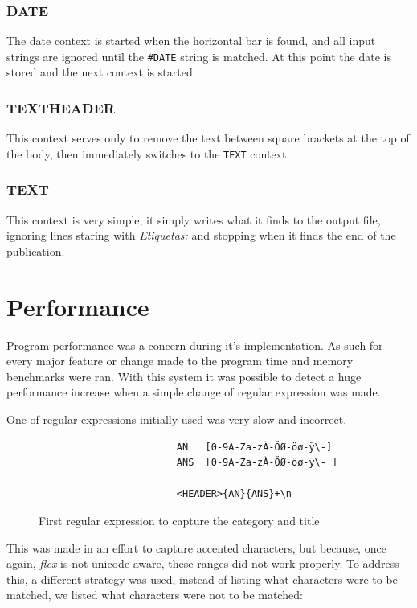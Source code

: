 \documentclass[a4paper]{article}
\begin{document}
\subsubsection{DATE}

The date context is started when the horizontal bar is found, and all input
strings are ignored until the \texttt{\#DATE} string is matched. At this point
the date is stored and the next context is started.

\subsubsection{TEXTHEADER}

This context serves only to remove the text between square brackets at the top
of the body, then immediately switches to the \texttt{TEXT} context.

\subsubsection{TEXT}

This context is very simple, it simply writes what it finds to the output file,
ignoring lines staring with \textit{Etiquetas:} and stopping when it finds the
end of the publication.

\section{Performance}

Program performance was a concern during it's implementation. As such for every
major feature or change made to the program time and memory benchmarks were
ran. With this system it was possible to detect a huge performance increase
when a simple change of regular expression was made.

One of regular expressions initially used was very slow and incorrect.
\begin{figure}[H]
    \centering
    \begin{verbatim}
                        AN   [0-9A-Za-zÀ-ÖØ-öø-ÿ\-]
                        ANS  [0-9A-Za-zÀ-ÖØ-öø-ÿ\- ]

                        <HEADER>{AN}{ANS}+\n
    \end{verbatim}
    \caption{First regular expression to capture the category and title}
\end{figure}

This was made in an effort to capture accented characters, but because, once
again, \textit{flex} is not unicode aware, these ranges did not work properly.
To address this, a different strategy was used, instead of listing what
characters were to be matched, we listed what characters were not to be
matched:
\end{document}
